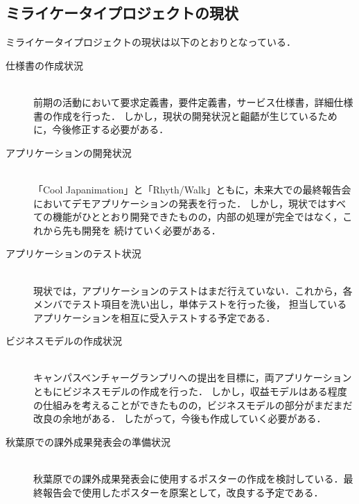 \subsection{ミライケータイプロジェクトの現状}

ミライケータイプロジェクトの現状は以下のとおりとなっている．

\begin{description}

\item[仕様書の作成状況]\mbox{}\\ 
前期の活動において要求定義書，要件定義書，サービス仕様書，詳細仕様書の作成を行った．
しかし，現状の開発状況と齟齬が生じているために，今後修正する必要がある．

\item[アプリケーションの開発状況]\mbox{}\\ 
「Cool Japanimation」と「Rhyth/Walk」ともに，未来大での最終報告会においてデモアプリケーションの発表を行った．
しかし，現状ではすべての機能がひととおり開発できたものの，内部の処理が完全ではなく，これから先も開発を
続けていく必要がある．

\item[アプリケーションのテスト状況]\mbox{}\\ 
現状では，アプリケーションのテストはまだ行えていない．これから，各メンバでテスト項目を洗い出し，単体テストを行った後，
担当しているアプリケーションを相互に受入テストする予定である．

\item[ビジネスモデルの作成状況]\mbox{}\\ 
キャンパスベンチャーグランプリへの提出を目標に，両アプリケーションともにビジネスモデルの作成を行った．
しかし，収益モデルはある程度の仕組みを考えることができたものの，ビジネスモデルの部分がまだまだ改良の余地がある．
したがって，今後も作成していく必要がある．

\item[秋葉原での課外成果発表会の準備状況]\mbox{}\\ 
秋葉原での課外成果発表会に使用するポスターの作成を検討している．最終報告会で使用したポスターを原案として，改良する予定である．

\end{description}
